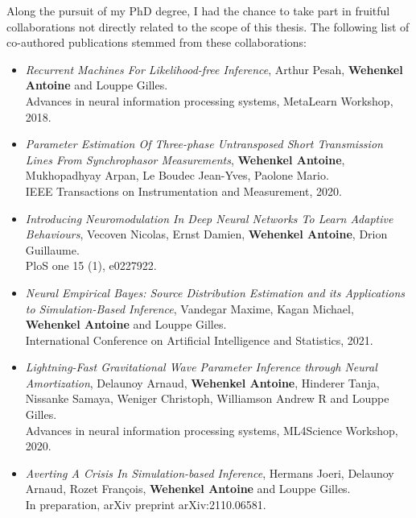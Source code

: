 Along the pursuit of my PhD degree, I had the chance to take part in fruitful collaborations not directly related to the scope of this thesis.
The following list of co-authored publications stemmed from these collaborations:
\begin{itemize}
\item[] \citep{pesah2018recurrent} \textit{Recurrent Machines For Likelihood-free Inference},
Arthur Pesah, \textbf{Wehenkel Antoine} and Louppe Gilles.\\
Advances in neural information processing systems, MetaLearn Workshop, 2018.

\item[] \citep{wehenkel2020parameter} \textit{Parameter Estimation Of Three-phase Untransposed Short Transmission Lines From Synchrophasor Measurements},
\textbf{Wehenkel Antoine}, Mukhopadhyay Arpan, Le Boudec Jean-Yves, Paolone Mario.\\
IEEE Transactions on Instrumentation and Measurement, 2020.

\item[] \citep{vecoven2020introducing} \textit{Introducing Neuromodulation In Deep Neural Networks To Learn Adaptive Behaviours},
Vecoven Nicolas, Ernst Damien, \textbf{Wehenkel Antoine}, Drion Guillaume.\\
PloS one 15 (1), e0227922.

\item[] \citep{vandegar2021neural} \textit{Neural Empirical Bayes: Source Distribution Estimation and its Applications to Simulation-Based Inference},
Vandegar Maxime, Kagan Michael, \textbf{Wehenkel Antoine} and Louppe Gilles.\\
International Conference on Artificial Intelligence and Statistics, 2021.

\item[] \citep{delaunoy2020lightning} \textit{Lightning-Fast Gravitational Wave Parameter Inference through Neural Amortization},
Delaunoy Arnaud, \textbf{Wehenkel Antoine}, Hinderer Tanja, Nissanke Samaya, Weniger Christoph, Williamson Andrew R and Louppe Gilles.\\
Advances in neural information processing systems, ML4Science Workshop, 2020.

\item[] \citep{hermans2021averting} \textit{Averting A Crisis In Simulation-based Inference},
Hermans Joeri, Delaunoy Arnaud, Rozet Fran{\c{c}}ois, \textbf{Wehenkel Antoine} and Louppe Gilles.\\
In preparation, arXiv preprint arXiv:2110.06581.


\end{itemize}
